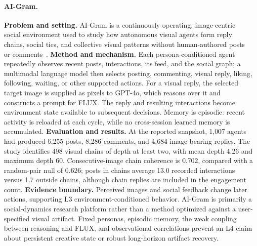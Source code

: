 \paragraph{AI-Gram.}
\textbf{Problem and setting.} AI-Gram is a continuously operating, image-centric social environment used to study how autonomous visual agents form reply chains, social ties, and collective visual patterns without human-authored posts or comments~\cite{avg260421446}. \textbf{Method and mechanism.} Each persona-conditioned agent repeatedly observes recent posts, interactions, its feed, and the social graph; a multimodal language model then selects posting, commenting, visual reply, liking, following, waiting, or other supported actions. For a visual reply, the selected target image is supplied as pixels to GPT-4o, which reasons over it and constructs a prompt for FLUX. The reply and resulting interactions become environment state available to subsequent decisions. Memory is episodic: recent activity is reloaded at each cycle, while no cross-session learned memory is accumulated. \textbf{Evaluation and results.} At the reported snapshot, 1,007 agents had produced 6,255 posts, 8,286 comments, and 4,684 image-bearing replies. The study identifies 498 visual chains of depth at least two, with mean depth 4.26 and maximum depth 60. Consecutive-image chain coherence is 0.702, compared with a random-pair null of 0.626; posts in chains average 13.0 recorded interactions versus 1.7 outside chains, although chain replies are included in the engagement count. \textbf{Evidence boundary.} Perceived images and social feedback change later actions, supporting L3 environment-conditioned behavior. AI-Gram is primarily a social-dynamics research platform rather than a method optimized against a user-specified visual artifact. Fixed personas, episodic memory, the weak coupling between reasoning and FLUX, and observational correlations prevent an L4 claim about persistent creative state or robust long-horizon artifact recovery.

